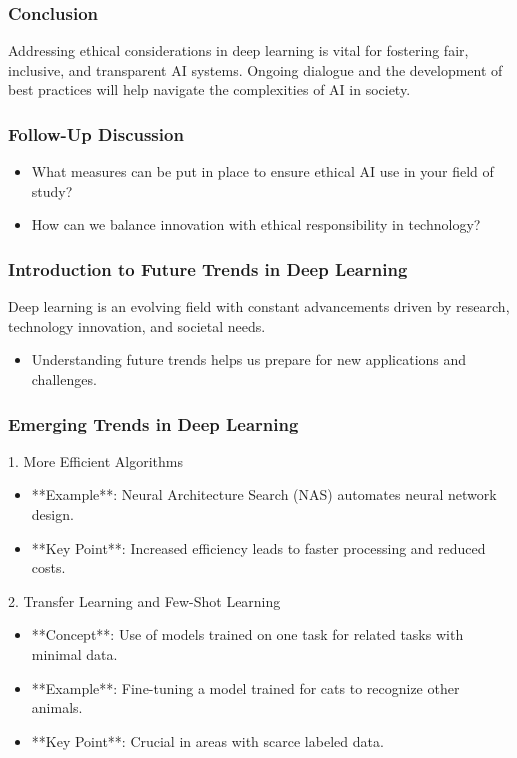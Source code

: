 \documentclass[aspectratio=169]{beamer}
\begin{document}
\begin{frame}[fragile]
    \frametitle{Conclusion}
    Addressing ethical considerations in deep learning is vital for fostering fair, inclusive, and transparent AI systems. Ongoing dialogue and the development of best practices will help navigate the complexities of AI in society.
\end{frame}

\begin{frame}[fragile]
    \frametitle{Follow-Up Discussion}
    \begin{itemize}
        \item What measures can be put in place to ensure ethical AI use in your field of study?
        \item How can we balance innovation with ethical responsibility in technology?
    \end{itemize}
\end{frame}

\begin{frame}[fragile]
    \frametitle{Introduction to Future Trends in Deep Learning}
    Deep learning is an evolving field with constant advancements driven by research, technology innovation, and societal needs. 

    \begin{itemize}
        \item Understanding future trends helps us prepare for new applications and challenges.
    \end{itemize}
\end{frame}

\begin{frame}[fragile]
    \frametitle{Emerging Trends in Deep Learning}
    \begin{block}{1. More Efficient Algorithms}
        \begin{itemize}
            \item **Example**: Neural Architecture Search (NAS) automates neural network design.
            \item **Key Point**: Increased efficiency leads to faster processing and reduced costs.
        \end{itemize}
    \end{block}

    \begin{block}{2. Transfer Learning and Few-Shot Learning}
        \begin{itemize}
            \item **Concept**: Use of models trained on one task for related tasks with minimal data.
            \item **Example**: Fine-tuning a model trained for cats to recognize other animals.
            \item **Key Point**: Crucial in areas with scarce labeled data.
        \end{itemize}
    \end{block}
\end{frame}
\end{document}
